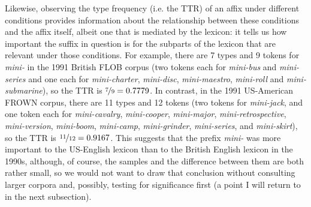 Likewise, observing the type frequency  (i.e. the TTR)  of an affix  under different conditions provides information about the relationship between these conditions and the affix  itself, albeit one that is mediated by the lexicon:  it tells us how important the suffix  in question is for the subparts of the lexicon that are relevant under those conditions. For example, there are 7 types  and 9 tokens  for \textit{mini-} in the 1991 British  FLOB  corpus (two tokens each for \textit{mini\hyp{}bus} and \textit{mini\hyp{}series} and one each for \textit{mini\hyp{}charter}, \textit{mini\hyp{}disc}, \textit{mini\hyp{}maestro}, \textit{mini\hyp{}roll} and \textit{mini\hyp{}submarine}), so the TTR is $\nicefrac{7}{9} = 0.7779$. In contrast, in the 1991 US\hyp{}American  FROWN  corpus, there are 11 types and 12 tokens (two tokens for \textit{mini\hyp{}jack}, and one token each for \textit{mini\hyp{}cavalry}, \textit{mini\hyp{}cooper}, \textit{mini\hyp{}major}, \textit{mini\hyp{}retrospective}, \textit{mini\hyp{}version}, \textit{mini\hyp{}boom}, \textit{mini\hyp{}camp}, \textit{mini\hyp{}grinder}, \textit{mini\hyp{}series}, and \textit{mini\hyp{}skirt}), so the TTR  is $\nicefrac{11}{12} = 0.9167$. This suggests that the prefix  \textit{mini-} was more important to the US\hyp{}English lexicon  than to the British  English lexicon in the 1990s, although, of course, the samples and the difference between them are both rather small, so we would not want to draw that conclusion without consulting larger  corpora and, possibly, testing for significance first (a point I will return to in the next subsection).

